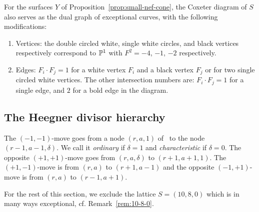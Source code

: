 \documentclass{amsart}
\begin{document}
\begin{corollary}\label{cor:exc-curves-degenerate-Y}
  For the surfaces $Y$ of Proposition~\ref{prop:small-nef-cone}, the
  Coxeter diagram of $S$ also serves as the dual graph of exceptional
  curves, with the following modifications:
  \begin{enumerate}
  \item Vertices: the double circled white, single white circles, and
    black vertices respectively correspond to ${\mathbb P}^1$ with $F^2=-4$,
    $-1$, $-2$ respectively.
  \item Edges: $F_i\cdot F_j=1$ for a white vertex $F_i$ and a black vertex
    $F_j$ or for two single circled white vertices. The other
    intersection numbers are: $F_i\cdot F_j=1$ for a single edge, and $2$ for
    a bold edge in the diagram.
  \end{enumerate}
\end{corollary}

\subsection{The Heegner divisor hierarchy}
\label{sec:heegner}

\begin{definition}\label{def:heegner-moves}
  The $(-1,-1)$-move goes from a node $(r,a,1)$ of \fign\ to the node
  $(r-1,a-1,\delta)$. We call it \emph{ordinary} if $\delta=1$ and
  \emph{characteristic} if $\delta=0$. 
  The opposite $(+1,+1)$-move goes from $(r,a,\delta)$ to
  $(r+1,a+1,1)$.
  The $(+1,-1)$-move is from $(r,a)$ to $(r+1,a-1)$ and the opposite
  $(-1,+1)$-move is from $(r,a)$ to $(r-1,a+1)$. 
\end{definition}

For the rest of this section, we exclude the lattice $S=(10,8,0)$
which is in many ways exceptional, cf. Remark~\ref{rem:10-8-0}.
\end{document}
